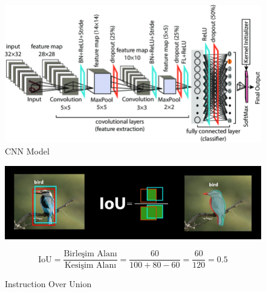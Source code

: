 \documentclass[12pt,a4paper]{article}
\begin{document}
\begin{enumerate}
\begin{figure}[h]
	\centering
	\includegraphics[width=\textwidth]{model.png}
	\caption{CNN Model}
	\label{fig:grafik}
\end{figure}

				
				
					\begin{figure}[h]
						
						\centering
					
						\includegraphics[width=1.1\textwidth, height=0.8\textheight]{union.jpg}
						
						
					\[
				\text{IoU} = \frac{\text{Birleşim Alanı}}{\text{Kesişim Alanı}} = \frac{60}{100 + 80 - 60} = \frac{60}{120} = 0.5
				\]
					
						\caption{Instruction Over Union}
						\label{fig:grafik}
					\end{figure}
				
				
	\end{enumerate}
\end{document}
